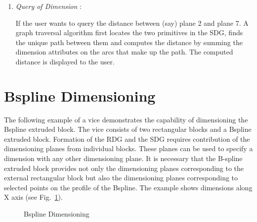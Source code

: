 \begin{enumerate}
		\item

    				{\em Query of Dimension} :

    				If the user wants to query the distance between (say) 
					plane 2 and
					plane 7. A graph traversal algorithm first locates the 
					two primitives in the SDG, finds the unique path between 
					them and computes the distance by summing the dimension 
					attributes on the arcs that make up the path. 
					The computed distance is displayed to the user.

		\end{enumerate}

	\section{Bspline Dimensioning}

	The following example of a vice demonstrates the capability of 
	dimensioning the Bspline extruded block. The vice consists of two 
	rectangular blocks and a Bspline extruded block.
    Formation of the RDG and the SDG requires contribution of the dimensioning
    planes from individual blocks. These planes can be used to specify a
    dimension with any other dimensioning plane. It is necessary that the
    B-spline extruded block provides not only the dimensioning planes 
	corresponding to the
    external rectangular block but also the dimensioning planes corresponding
    to selected points on the profile of the Bspline.
	The example shows dimensions along X axis (see Fig.~\ref{ex2dim}).


        \begin{figure}[htbp]
            \caption{Bspline Dimensioning}
            \label{ex2dim}
        \end{figure}


